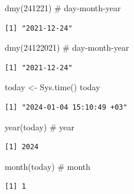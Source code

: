 \documentclass[
  letterpaper,
  DIV=11,
  numbers=noendperiod]{scrreprt}
\newenvironment{Shaded}{\begin{snugshade}}{\end{snugshade}}
\newcommand{\CommentTok}[1]{\textcolor[rgb]{0.37,0.37,0.37}{#1}}
\newcommand{\DecValTok}[1]{\textcolor[rgb]{0.68,0.00,0.00}{#1}}
\newcommand{\FunctionTok}[1]{\textcolor[rgb]{0.28,0.35,0.67}{#1}}
\newcommand{\NormalTok}[1]{\textcolor[rgb]{0.00,0.23,0.31}{#1}}
\newcommand{\OtherTok}[1]{\textcolor[rgb]{0.00,0.23,0.31}{#1}}
\begin{document}
\begin{Shaded}
\begin{Highlighting}[]
\FunctionTok{dmy}\NormalTok{(}\DecValTok{241221}\NormalTok{) }\CommentTok{\# day{-}month{-}year}
\end{Highlighting}
\end{Shaded}

\begin{verbatim}
[1] "2021-12-24"
\end{verbatim}

\begin{Shaded}
\begin{Highlighting}[]
\FunctionTok{dmy}\NormalTok{(}\DecValTok{24122021}\NormalTok{) }\CommentTok{\# day{-}month{-}year}
\end{Highlighting}
\end{Shaded}

\begin{verbatim}
[1] "2021-12-24"
\end{verbatim}

\begin{Shaded}
\begin{Highlighting}[]
\NormalTok{today }\OtherTok{\textless{}{-}} \FunctionTok{Sys.time}\NormalTok{()}
\NormalTok{today}
\end{Highlighting}
\end{Shaded}

\begin{verbatim}
[1] "2024-01-04 15:10:49 +03"
\end{verbatim}

\begin{Shaded}
\begin{Highlighting}[]
\FunctionTok{year}\NormalTok{(today) }\CommentTok{\# year}
\end{Highlighting}
\end{Shaded}

\begin{verbatim}
[1] 2024
\end{verbatim}

\begin{Shaded}
\begin{Highlighting}[]
\FunctionTok{month}\NormalTok{(today) }\CommentTok{\# month}
\end{Highlighting}
\end{Shaded}

\begin{verbatim}
[1] 1
\end{verbatim}
\end{document}
